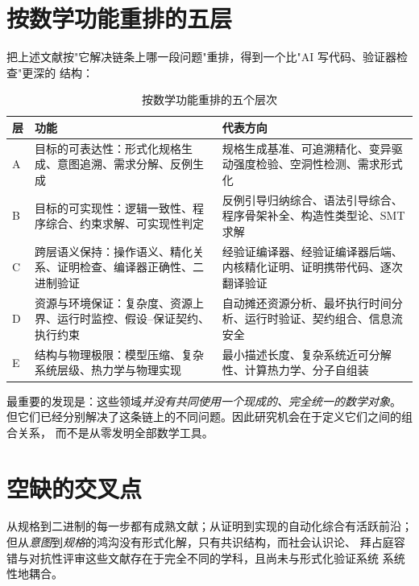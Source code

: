 \section{按数学功能重排的五层}\label{sec:five-layers}

把上述文献按"它解决链条上哪一段问题"重排，得到一个比"AI 写代码、验证器检查"更深的
结构：

\begin{table}[htbp]
\centering
\small
\caption{按数学功能重排的五个层次}\label{tab:five-layers}
\begin{tabular}{L{1.6cm}L{5.4cm}L{7.2cm}}
\toprule
\textbf{层} & \textbf{功能} & \textbf{代表方向} \\
\midrule
A & 目标的可表达性：形式化规格生成、意图追溯、需求分解、反例生成 &
  规格生成基准、可追溯精化、变异驱动强度检验、空洞性检测、需求形式化 \\
B & 目标的可实现性：逻辑一致性、程序综合、约束求解、可实现性判定 &
  反例引导归纳综合、语法引导综合、程序骨架补全、构造性类型论、SMT 求解 \\
C & 跨层语义保持：操作语义、精化关系、证明检查、编译器正确性、二进制验证 &
  经验证编译器、经验证编译器后端、内核精化证明、证明携带代码、逐次翻译验证 \\
D & 资源与环境保证：复杂度、资源上界、运行时监控、假设--保证契约、执行约束 &
  自动摊还资源分析、最坏执行时间分析、运行时验证、契约组合、信息流安全 \\
E & 结构与物理极限：模型压缩、复杂系统层级、热力学与物理实现 &
  最小描述长度、复杂系统近可分解性、计算热力学、分子自组装 \\
\bottomrule
\end{tabular}
\end{table}

最重要的发现是：这些领域\emph{并没有共同使用一个现成的、完全统一的数学对象}。
但它们已经分别解决了这条链上的不同问题。因此研究机会在于定义它们之间的组合关系，
而不是从零发明全部数学工具。

\section{空缺的交叉点}\label{sec:gaps}

\begin{principle}[文献地图的形状]\label{pr:map-shape}
从规格到二进制的每一步都有成熟文献；从证明到实现的自动化综合有活跃前沿；
但从\emph{意图}到\emph{规格}的鸿沟没有形式化解，只有共识结构，而社会认识论、
拜占庭容错与对抗性评审这些文献存在于完全不同的学科，且尚未与形式化验证系统
系统性地耦合。
\end{principle}

